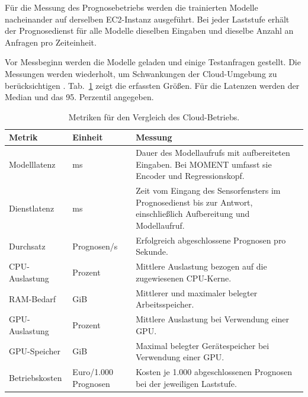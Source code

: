 Für die Messung des Prognosebetriebs werden die trainierten Modelle nacheinander auf derselben EC2-Instanz ausgeführt. Bei jeder Laststufe erhält der Prognosedienst für alle Modelle dieselben Eingaben und dieselbe Anzahl an Anfragen pro Zeiteinheit.

\begin{samepage}
Vor Messbeginn werden die Modelle geladen und einige Testanfragen gestellt. Die Messungen werden wiederholt, um Schwankungen der Cloud-Umgebung zu berücksichtigen \parencite{leitnerPatternsChaosStudy2016}. Tab.~\ref{tab:cloud-metriken} zeigt die erfassten Größen. Für die Latenzen werden der Median und das 95. Perzentil angegeben.
\par
\end{samepage}

\begin{table}[htbp]
    \centering
    \small
    \renewcommand{\arraystretch}{1.15}
    \begin{tabularx}{\textwidth}{@{}>{\raggedright\arraybackslash}p{3.0cm}>{\raggedright\arraybackslash}p{1.8cm}>{\raggedright\arraybackslash}X@{}}
        \toprule
        Metrik & Einheit & Messung \\
        \midrule
        Modelllatenz & ms & Dauer des Modellaufrufs mit aufbereiteten Eingaben. Bei MOMENT umfasst sie Encoder und Regressionskopf. \\
        Dienstlatenz & ms & Zeit vom Eingang des Sensorfensters im Prognosedienst bis zur Antwort, einschließlich Aufbereitung und Modellaufruf. \\
        Durchsatz & Prognosen/s & Erfolgreich abgeschlossene Prognosen pro Sekunde. \\
        CPU-Auslastung & Prozent & Mittlere Auslastung bezogen auf die zugewiesenen CPU-Kerne. \\
        RAM-Bedarf & GiB & Mittlerer und maximaler belegter Arbeitsspeicher. \\
        GPU-Auslastung & Prozent & Mittlere Auslastung bei Verwendung einer GPU. \\
        GPU-Speicher & GiB & Maximal belegter Gerätespeicher bei Verwendung einer GPU. \\
        Betriebskosten & Euro/1.000 Prognosen & Kosten je 1.000 abgeschlossenen Prognosen bei der jeweiligen Laststufe. \\
        \bottomrule
    \end{tabularx}
    \caption{Metriken für den Vergleich des Cloud-Betriebs.}
    \label{tab:cloud-metriken}
\end{table}

